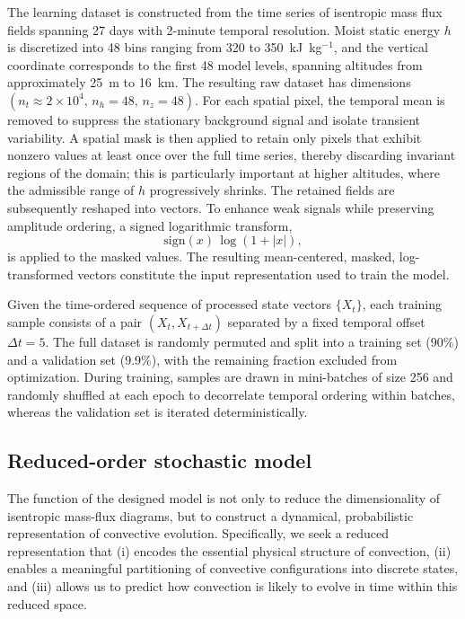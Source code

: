\documentclass[11pt]{article}
\begin{document}
The learning dataset is constructed from the time series of isentropic mass flux fields spanning 27 days with 2-minute temporal resolution. Moist static energy $h$ is discretized into 48 bins ranging from 320 to 350~kJ~kg$^{-1}$, and the vertical coordinate corresponds to the first 48 model levels, spanning altitudes from approximately 25~m to 16~km. The resulting raw dataset has dimensions $(n_t \approx 2\times10^{4},\, n_h=48,\, n_z=48)$. For each spatial pixel, the temporal mean is removed to suppress the stationary background signal and isolate transient variability. A spatial mask is then applied to retain only pixels that exhibit nonzero values at least once over the full time series, thereby discarding invariant regions of the domain; this is particularly important at higher altitudes, where the admissible range of $h$ progressively shrinks. The retained fields are subsequently reshaped into vectors. To enhance weak signals while preserving amplitude ordering, a signed logarithmic transform,
\[
\mathrm{sign}(x)\,\log(1+|x|),
\]
is applied to the masked values. The resulting mean-centered, masked, log-transformed vectors constitute the input representation used to train the model.

Given the time-ordered sequence of processed state vectors $\{X_t\}$, each training sample consists of a pair $(X_t, X_{t+\Delta t})$ separated by a fixed temporal offset $\Delta t = 5$. The full dataset is randomly permuted and split into a training set (90\%) and a validation set (9.9\%), with the remaining fraction excluded from optimization. During training, samples are drawn in mini-batches of size 256 and randomly shuffled at each epoch to decorrelate temporal ordering within batches, whereas the validation set is iterated deterministically.

\subsection{Reduced-order stochastic model}

The function of the designed model is not only to reduce the dimensionality of isentropic mass-flux diagrams, but to construct a dynamical, probabilistic representation of convective evolution. Specifically, we seek a reduced representation that (i) encodes the essential physical structure of convection, (ii) enables a meaningful partitioning of convective configurations into discrete states, and (iii) allows us to predict how convection is likely to evolve in time within this reduced space.
\end{document}

